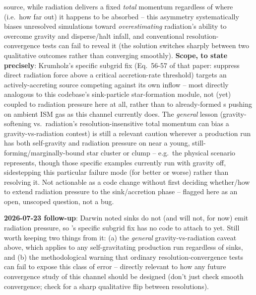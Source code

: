 \begin{itemize}
    source, while radiation delivers a fixed \emph{total} momentum
    regardless of where (i.e.\ how far out) it happens to be absorbed --
    this asymmetry systematically biases unresolved simulations toward
    \emph{overestimating} radiation's ability to overcome gravity and
    disperse/halt infall, and conventional resolution-convergence tests
    can fail to reveal it (the solution switches sharply between two
    qualitative outcomes rather than converging smoothly).
    \textbf{Scope, to state precisely}: Krumholz's specific subgrid fix
    (Eq.~56-57 of that paper: suppress direct radiation force above a
    critical accretion-rate threshold) targets an actively-accreting
    source competing against its own inflow -- most directly analogous
    to this codebase's sink-particle star-formation module, not (yet)
    coupled to radiation pressure here at all, rather than to
    already-formed s pushing on ambient ISM gas as this
    channel currently does. The \emph{general} lesson (gravity-softening
    vs.\ radiation's resolution-insensitive total momentum can bias a
    gravity-vs-radiation contest) is still a relevant caution wherever
    a production run has both self-gravity and radiation pressure on
    near a young, still-forming/marginally-bound star cluster or clump
    -- e.g.\ the physical scenario 
    represents, though those specific examples currently run with
    gravity off, sidestepping this particular failure mode (for better
    or worse) rather than resolving it. Not actionable as a code change
    without first deciding whether/how to extend radiation pressure to
    the sink/accretion phase -- flagged here as an open, unscoped
    question, not a bug.

    \textbf{2026-07-23 follow-up}: Darwin noted sinks do not (and will
    not, for now) emit radiation pressure, so \citet{Krumholz2018}'s
    specific subgrid fix has no code to attach to yet. Still worth
    keeping two things from it: (a) the \emph{general} gravity-vs-radiation
    caveat above, which applies to any self-gravitating production run
    regardless of sinks, and (b) the methodological warning that ordinary
    resolution-convergence tests can fail to expose this class of error
    -- directly relevant to how any future convergence study of this
    channel should be designed (don't just check smooth convergence;
    check for a sharp qualitative flip between resolutions).


\end{itemize}
